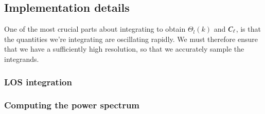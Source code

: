 \subsection{Implementation details}\label{ssec:M4:implementations} 
One of the most crucial parts about integrating to obtain $\Theta_l(k)$ and $C_\ell$, is that the quantities we're integrating are oscillating rapidly. We must therefore ensure that we have a sufficiently high resolution, so that we accurately sample the integrands. 

\subsubsection{LOS integration} \label{sssec:M4:implementations:LOS_integration}


\subsubsection{Computing the power spectrum } \label{sssec:M4:implementations:integrating_across_k}